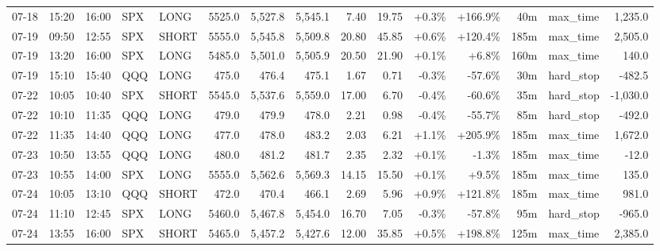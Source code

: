 \documentclass[11pt,a4paper,twoside]{article}
\begin{document}
\begin{landscape}
\begin{center}
\begin{longtable}{>{\color{txtmain}}l l l l l r r r r r r r r >{\color{txtmain}}l r}
07-18 & 15:20 & 16:00 & SPX & LONG & 5525.0 & 5,527.8 & 5,545.1 & 7.40 & 19.75 & \textcolor{wingreen}{+0.3\%} & \textcolor{wingreen}{+166.9\%} & 40m & max\_time & \textcolor{wingreen}{1,235.0} \\
07-19 & 09:50 & 12:55 & SPX & SHORT & 5555.0 & 5,545.8 & 5,509.8 & 20.80 & 45.85 & \textcolor{wingreen}{+0.6\%} & \textcolor{wingreen}{+120.4\%} & 185m & max\_time & \textcolor{wingreen}{2,505.0} \\
07-19 & 13:20 & 16:00 & SPX & LONG & 5485.0 & 5,501.0 & 5,505.9 & 20.50 & 21.90 & \textcolor{wingreen}{+0.1\%} & \textcolor{wingreen}{+6.8\%} & 160m & max\_time & \textcolor{wingreen}{140.0} \\
07-19 & 15:10 & 15:40 & QQQ & LONG & 475.0 & 476.4 & 475.1 & 1.67 & 0.71 & \textcolor{lossred}{-0.3\%} & \textcolor{lossred}{-57.6\%} & 30m & hard\_stop & \textcolor{lossred}{-482.5} \\
07-22 & 10:05 & 10:40 & SPX & SHORT & 5545.0 & 5,537.6 & 5,559.0 & 17.00 & 6.70 & \textcolor{lossred}{-0.4\%} & \textcolor{lossred}{-60.6\%} & 35m & hard\_stop & \textcolor{lossred}{-1,030.0} \\
07-22 & 10:10 & 11:35 & QQQ & LONG & 479.0 & 479.9 & 478.0 & 2.21 & 0.98 & \textcolor{lossred}{-0.4\%} & \textcolor{lossred}{-55.7\%} & 85m & hard\_stop & \textcolor{lossred}{-492.0} \\
07-22 & 11:35 & 14:40 & QQQ & LONG & 477.0 & 478.0 & 483.2 & 2.03 & 6.21 & \textcolor{wingreen}{+1.1\%} & \textcolor{wingreen}{+205.9\%} & 185m & max\_time & \textcolor{wingreen}{1,672.0} \\
07-23 & 10:50 & 13:55 & QQQ & LONG & 480.0 & 481.2 & 481.7 & 2.35 & 2.32 & \textcolor{wingreen}{+0.1\%} & \textcolor{lossred}{-1.3\%} & 185m & max\_time & \textcolor{lossred}{-12.0} \\
07-23 & 10:55 & 14:00 & SPX & LONG & 5555.0 & 5,562.6 & 5,569.3 & 14.15 & 15.50 & \textcolor{wingreen}{+0.1\%} & \textcolor{wingreen}{+9.5\%} & 185m & max\_time & \textcolor{wingreen}{135.0} \\
07-24 & 10:05 & 13:10 & QQQ & SHORT & 472.0 & 470.4 & 466.1 & 2.69 & 5.96 & \textcolor{wingreen}{+0.9\%} & \textcolor{wingreen}{+121.8\%} & 185m & max\_time & \textcolor{wingreen}{981.0} \\
07-24 & 11:10 & 12:45 & SPX & LONG & 5460.0 & 5,467.8 & 5,454.0 & 16.70 & 7.05 & \textcolor{lossred}{-0.3\%} & \textcolor{lossred}{-57.8\%} & 95m & hard\_stop & \textcolor{lossred}{-965.0} \\
07-24 & 13:55 & 16:00 & SPX & SHORT & 5465.0 & 5,457.2 & 5,427.6 & 12.00 & 35.85 & \textcolor{wingreen}{+0.5\%} & \textcolor{wingreen}{+198.8\%} & 125m & max\_time & \textcolor{wingreen}{2,385.0} \\

\end{longtable}
\end{center}
\end{landscape}
\end{document}
